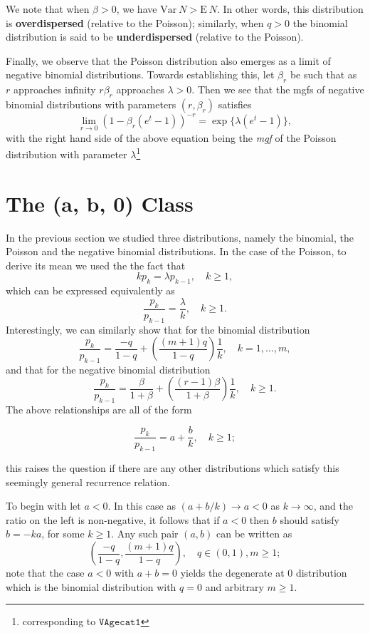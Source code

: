 \documentclass[]{book}
\let\rmarkdownfootnote\footnote%
\def\footnote{\protect\rmarkdownfootnote}
\theoremstyle{definition}
\theoremstyle{definition}
\theoremstyle{definition}
\theoremstyle{remark}
\begin{document}
We note that when \(\beta>0\), we have
\(\mathrm{Var}~{N} >\mathrm{E}~{N}\). In other words, this distribution
is \textbf{overdispersed} (relative to the Poisson); similarly, when
\(q>0\) the binomial distribution is said to be \textbf{underdispersed}
(relative to the Poisson).

Finally, we observe that the Poisson distribution also emerges as a
limit of negative binomial distributions. Towards establishing this, let
\(\beta_r\) be such that as \(r\) approaches infinity \(r\beta_r\)
approaches \(\lambda>0\). Then we see that the mgfs of negative binomial
distributions with parameters \((r,\beta_r)\) satisfies \[
\lim_{r\rightarrow 0} (1-\beta_r(e^t-1))^{-r}=\exp\{\lambda(e^t-1)\},
\] with the right hand side of the above equation being the \emph{mgf}
of the Poisson distribution with parameter \(\lambda\)\footnote{corresponding
  to \(\texttt{VAgecat1}\)}

\section{The (a, b, 0) Class}\label{S:the-a-b-0-class}

In the previous section we studied three distributions, namely the
binomial, the Poisson and the negative binomial distributions. In the
case of the Poisson, to derive its mean we used the the fact that \[
kp_k=\lambda p_{k-1}, \quad k\geq 1,
\] which can be expressed equivalently as \[
\frac{p_k}{p_{k-1}}=\frac{\lambda}{k}, \quad k\geq 1. 
\] Interestingly, we can similarly show that for the binomial
distribution \[
\frac{p_k}{p_{k-1}}=\frac{-q}{1-q}+\left(\frac{(m+1)q}{1-q}\right)\frac{1}{k}, \quad k=1,\ldots,m, 
\] and that for the negative binomial distribution \[
\frac{p_k}{p_{k-1}}=\frac{\beta}{1+\beta}+\left(\frac{(r-1)\beta}{1+\beta}\right)\frac{1}{k}, \quad k\geq 1. 
\] The above relationships are all of the form

\begin{equation}
\frac{p_k}{p_{k-1}}=a+\frac{b}{k}, \quad k\geq 1; 
\label{eq:ab0}
\end{equation}

this raises the question if there are any other distributions which
satisfy this seemingly general recurrence relation.

To begin with let \(a<0\). In this case as \((a+b/k)\rightarrow a<0\) as
\(k\rightarrow \infty\), and the ratio on the left is non-negative, it
follows that if \(a<0\) then \(b\) should satisfy \(b=-ka\), for some
\(k\geq 1\). Any such pair \((a,b)\) can be written as \[
\left(\frac{-q}{1-q},\frac{(m+1)q}{1-q}\right), \quad q\in(0,1), m\geq 1;
\] note that the case \(a<0\) with \(a+b=0\) yields the degenerate at
\(0\) distribution which is the binomial distribution with \(q=0\) and
arbitrary \(m\geq 1\).
\end{document}
